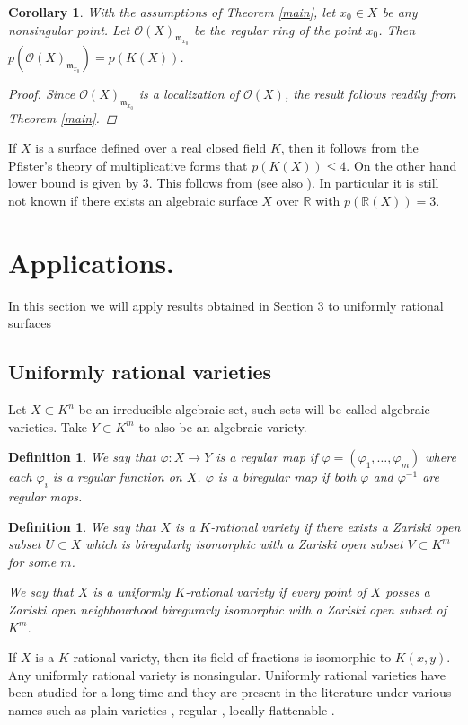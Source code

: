 \documentclass[12pt,reqno]{amsart}   	%
\newtheorem{df}[thm]{Definition}
\newtheorem{cor}[thm]{Corollary}
\theoremstyle{obs}
\theoremstyle{prob}
\theoremstyle{conj}
\theoremstyle{remark}
\newcommand{\R}{\mathbb{R}}
\newcommand{\OO}{\mathcal{O}}
\begin{document}
\begin{cor}\label{local}
With the assumptions of Theorem \ref{main},  let $x_0 \in X $ be any nonsingular point. Let $\OO(X)_{\mathfrak{m}_{x_0}}$ be the regular ring of the point $x_0$. Then $p(\OO(X)_{\mathfrak{m}_{x_0}})=p(K(X))$.

\begin{proof}
Since $\OO(X)_{\mathfrak{m}_{x_0}}$ is a localization of $\OO(X)$, the result follows readily from Theorem \ref{main}.
\end{proof}

\end{cor}

If $X$ is a surface defined over a real closed field $K$, then it follows from the Pfister's theory of multiplicative forms \cite[Corollary 3.4]{pfister1995} that $p(K(X))\leq 4$. On the other hand lower bound is given by 3. This follows from \cite[Corollary 2]{kucharz1991} (see also \cite[Question 4.1]{grimm2015}). In particular it is still not known if there exists an algebraic surface $X$ over $\R$ with $p(\R(X))=3$.



\section{Applications.}
In this section we will apply results obtained in Section 3 to uniformly rational surfaces

\subsection{Uniformly rational varieties}
Let $X \subset K^n$ be an irreducible algebraic set, such sets will be called  algebraic varieties. Take $Y \subset K^m$ to also be an algebraic variety.

\begin{df}
We say that $\varphi : X \rightarrow Y$ is a regular map if $\varphi=\left( \varphi_1, \dots, \varphi_m \right)$ where each $\varphi_i$ is a regular function on $X$. $\varphi$ is a biregular map if both $\varphi$ and $\varphi^{-1}$ are regular maps.
\end{df}

\begin{df}\label{rational}
We say that $X$ is a $K$-rational variety if there exists a Zariski open subset $U \subset X$ which is biregularly isomorphic with a Zariski open subset $V\subset K^m$ for some $m$.


We say that $X$ is a uniformly $K$-rational variety if every point of $X$ posses a Zariski open neighbourhood biregurarly isomorphic with a Zariski open subset of $K^m$.

\end{df}
If $X$ is a $K$-rational variety, then its field of fractions is isomorphic to $K(x,y)$. Any uniformly rational variety is nonsingular. Uniformly rational varieties have been studied for a long time and they are present in the literature under various names such as plain varieties \cite{bhsv2008}, regular \cite{gromov1989}, locally flattenable \cite{popov2020}.
\end{document}
